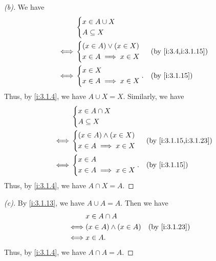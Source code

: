 \begin{proof}[(b)]
  We have
  \begin{align*}
         & \begin{dcases}
             x \in A \cup X \\
             A \subseteq X
           \end{dcases}                        \\
    \iff & \begin{dcases}
             (x \in A) \lor (x \in X) \\
             x \in A \implies x \in X
           \end{dcases} &  & \by{i:3.4,i:3.1.15} \\
    \iff & \begin{dcases}
             x \in X \\
             x \in A \implies x \in X
           \end{dcases}.    &  & \by{i:3.1.15}
  \end{align*}
  Thus, by \cref{i:3.1.4}, we have \(A \cup X = X\).
  Similarly, we have
  \begin{align*}
         & \begin{dcases}
             x \in A \cap X \\
             A \subseteq X
           \end{dcases}                           \\
    \iff & \begin{dcases}
             (x \in A) \land (x \in X) \\
             x \in A \implies x \in X
           \end{dcases} &  & \by{i:3.1.15,i:3.1.23} \\
    \iff & \begin{dcases}
             x \in A \\
             x \in A \implies x \in X
           \end{dcases}.     &  & \by{i:3.1.15}
  \end{align*}
  Thus, by \cref{i:3.1.4}, we have \(A \cap X = A\).
\end{proof}

\begin{proof}[(c)]
  By \cref{i:3.1.13}, we have \(A \cup A = A\).
  Then we have
  \begin{align*}
         & x \in A \cap A                               \\
    \iff & (x \in A) \land (x \in A) &  & \by{i:3.1.23} \\
    \iff & x \in A.
  \end{align*}
  Thus, by \cref{i:3.1.4}, we have \(A \cap A = A\).
\end{proof}


